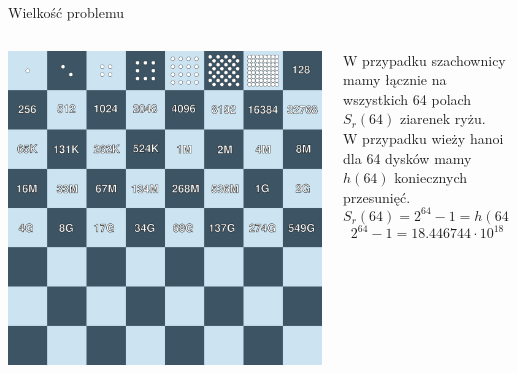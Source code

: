 \begin{frame}{Wielkość problemu}
    \centering
    \begin{columns}
        \begin{column}{0.5\textwidth}
            \includegraphics[height=0.7\textheight]{recursion/graphics/chessboard2.png}
        \end{column}
        \begin{column}{0.5\textwidth}
            W przypadku szachownicy mamy łącznie na wszystkich 64 polach $S_r(64)$ ziarenek ryżu. \\
            W przypadku wieży hanoi dla 64 dysków mamy $h(64)$ koniecznych przesunięć.
            \[ S_r(64) = 2^{64} - 1 = h(64) \]
            \[ 2^{64} - 1 = 18.446744 \cdot 10^{18} \]
        \end{column}
    \end{columns}
\end{frame}